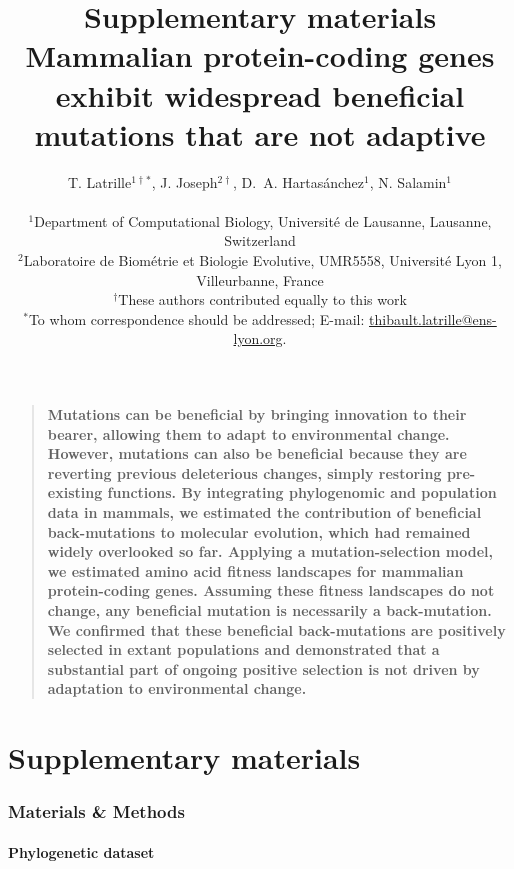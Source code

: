 \documentclass[12pt]{article}
\title{\textbf{Supplementary materials}\\\vspace*{1cm}Mammalian protein-coding genes exhibit widespread beneficial mutations that are not adaptive}
\author
{T. {Latrille}$^{1\dag\ast}$, J. {Joseph}$^{2\dag}$, D.~A. {Hartasánchez}$^{1}$, N. {Salamin}$^{1}$\\
\\
\normalsize{$^{1}$Department of Computational Biology, Université de Lausanne, Lausanne, Switzerland}\\
\normalsize{$^{2}$Laboratoire de Biométrie et Biologie Evolutive, UMR5558, Université Lyon 1, Villeurbanne, France}\\
\normalsize{$^{\dag}$These authors contributed equally to this work}\\
\normalsize{$^\ast$To whom correspondence should be addressed; E-mail:  \href{mailto:thibault.latrille@ens-lyon.org}{thibault.latrille@ens-lyon.org}.}
}
\date{}
\newenvironment{sciabstract}{%
    \begin{quote} \bf}
    {\end{quote}}
\begin{document}

    \baselineskip24pt


    \maketitle


    \begin{sciabstract}
        Mutations can be beneficial by bringing innovation to their bearer, allowing them to adapt to environmental change.
        However, mutations can also be beneficial because they are reverting previous deleterious changes, simply restoring pre-existing functions.
        By integrating phylogenomic and population data in mammals, we estimated the contribution of beneficial back-mutations to molecular evolution, which had remained widely overlooked so far.
        Applying a mutation-selection model, we estimated amino acid fitness landscapes for mammalian protein-coding genes.
        Assuming these fitness landscapes do not change, any beneficial mutation is necessarily a back-mutation.
        We confirmed that these beneficial back-mutations are positively selected in extant populations and demonstrated that a substantial part of ongoing positive selection is not driven by adaptation to environmental change.
    \end{sciabstract}

    \part*{Supplementary materials}
    \tableofcontents
    \clearpage


    \section{Materials \& Methods}
    \label{sec:methods}

    \subsection{Phylogenetic dataset}\label{subsec:phylo-dataset}
\end{document}
